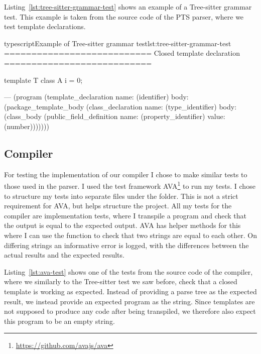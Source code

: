 Listing~\vref{lst:tree-sitter-grammar-test} shows an example of a Tree-sitter grammar test.
This example is taken from the source code of the PTS parser, where we test template declarations.

\begin{code}{typescript}{Example of Tree-sitter grammar test}{lst:tree-sitter-grammar-test}
    ===========================
    Closed template declaration
    ===========================

    template T {
        class A {
            i = 0;
        }
    }

    ---
    (program
        (template_declaration
            name: (identifier)
            body: (package_template_body
                    (class_declaration
                        name: (type_identifier)
                        body: (class_body
                            (public_field_definition
                                name: (property_identifier)
                                value: (number)))))))

\end{code}

\subsection{Compiler}\label{subsec:testing-transpiler}

For testing the implementation of our compiler I chose to make similar tests to those used in the parser.
I used the test framework AVA\footnote{\url{https://github.com/avajs/ava}} to run my tests.
I chose to structure my tests into separate files under the  folder.
This is not a strict requirement for AVA, but helps structure the project.
All my tests for the compiler are implementation tests, where I transpile a program and check that the output is equal to the expected output.
AVA has helper methods for this where I can use the  function to check that two strings are equal to each other.
On differing strings an informative error is logged, with the differences between the actual results and the expected results.

Listing~\vref{lst:ava-test} shows one of the tests from the source code of the compiler, where we similarly to the Tree-sitter test we saw before, check that a closed template is working as expected.
Instead of providing a parse tree as the expected result, we instead provide an expected program as the string.
Since templates are not supposed to produce any code after being transpiled, we therefore also expect this program to be an empty string.

